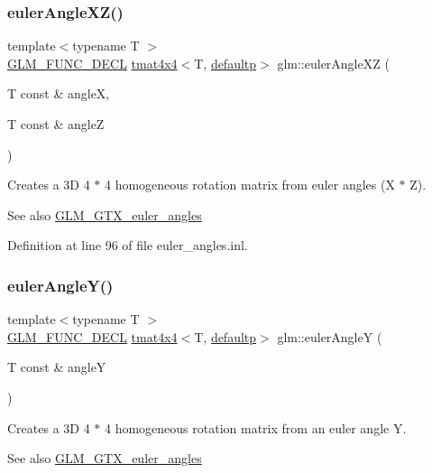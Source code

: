 \subsubsection{\texorpdfstring{eulerAngleXZ()}{eulerAngleXZ()}}
{\footnotesize\ttfamily template$<$typename T $>$ \\
\mbox{\hyperlink{setup_8hpp_ab2d052de21a70539923e9bcbf6e83a51}{G\+L\+M\+\_\+\+F\+U\+N\+C\+\_\+\+D\+E\+CL}} \mbox{\hyperlink{structglm_1_1tmat4x4}{tmat4x4}}$<$T, \mbox{\hyperlink{namespaceglm_a0f04f086094c747d227af4425893f545a9d21ccd8b5a009ec7eb7677befc3bf51}{defaultp}}$>$ glm\+::euler\+Angle\+XZ (\begin{DoxyParamCaption}\item[{T const \&}]{angleX,  }\item[{T const \&}]{angleZ }\end{DoxyParamCaption})}

Creates a 3D 4 $\ast$ 4 homogeneous rotation matrix from euler angles (X $\ast$ Z). \begin{DoxySeeAlso}{See also}
\mbox{\hyperlink{group__gtx__euler__angles}{G\+L\+M\+\_\+\+G\+T\+X\+\_\+euler\+\_\+angles}} 
\end{DoxySeeAlso}


Definition at line 96 of file euler\+\_\+angles.\+inl.

\mbox{\label{group__gtx__euler__angles_gaeb193af1184bdf39c23636d756e1ff33}} 
\subsubsection{\texorpdfstring{eulerAngleY()}{eulerAngleY()}}
{\footnotesize\ttfamily template$<$typename T $>$ \\
\mbox{\hyperlink{setup_8hpp_ab2d052de21a70539923e9bcbf6e83a51}{G\+L\+M\+\_\+\+F\+U\+N\+C\+\_\+\+D\+E\+CL}} \mbox{\hyperlink{structglm_1_1tmat4x4}{tmat4x4}}$<$T, \mbox{\hyperlink{namespaceglm_a0f04f086094c747d227af4425893f545a9d21ccd8b5a009ec7eb7677befc3bf51}{defaultp}}$>$ glm\+::euler\+AngleY (\begin{DoxyParamCaption}\item[{T const \&}]{angleY }\end{DoxyParamCaption})}

Creates a 3D 4 $\ast$ 4 homogeneous rotation matrix from an euler angle Y. \begin{DoxySeeAlso}{See also}
\mbox{\hyperlink{group__gtx__euler__angles}{G\+L\+M\+\_\+\+G\+T\+X\+\_\+euler\+\_\+angles}} 
\end{DoxySeeAlso}



